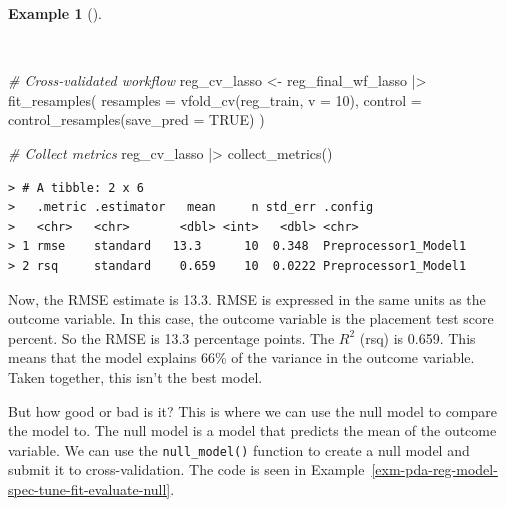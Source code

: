 \documentclass[
  letterpaper,
  DIV=11,
  numbers=noendperiod]{scrreprt}
\newenvironment{Shaded}{\begin{snugshade}}{\end{snugshade}}
\newcommand{\AttributeTok}[1]{\textcolor[rgb]{0.00,0.00,0.00}{#1}}
\newcommand{\CommentTok}[1]{\textcolor[rgb]{0.00,0.00,0.00}{\textit{#1}}}
\newcommand{\ConstantTok}[1]{\textcolor[rgb]{0.00,0.00,0.00}{#1}}
\newcommand{\DecValTok}[1]{\textcolor[rgb]{0.00,0.00,0.00}{#1}}
\newcommand{\FunctionTok}[1]{\textcolor[rgb]{0.00,0.00,0.00}{#1}}
\newcommand{\NormalTok}[1]{\textcolor[rgb]{0.00,0.00,0.00}{#1}}
\newcommand{\OtherTok}[1]{\textcolor[rgb]{0.00,0.00,0.00}{#1}}
\newcommand{\SpecialCharTok}[1]{\textcolor[rgb]{0.00,0.00,0.00}{#1}}
\theoremstyle{definition}
\newtheorem{example}{Example}[chapter]
\theoremstyle{remark}
\begin{document}
\begin{example}[]\protect\hypertarget{exm-pda-reg-model-spec-tune-fit-evaluate}{}\label{exm-pda-reg-model-spec-tune-fit-evaluate}

~

\begin{Shaded}
\begin{Highlighting}[]
\CommentTok{\# Cross{-}validated workflow}
\NormalTok{reg\_cv\_lasso }\OtherTok{\textless{}{-}}
\NormalTok{  reg\_final\_wf\_lasso }\SpecialCharTok{|\textgreater{}}
  \FunctionTok{fit\_resamples}\NormalTok{(}
    \AttributeTok{resamples =} \FunctionTok{vfold\_cv}\NormalTok{(reg\_train, }\AttributeTok{v =} \DecValTok{10}\NormalTok{),}
    \AttributeTok{control =} \FunctionTok{control\_resamples}\NormalTok{(}\AttributeTok{save\_pred =} \ConstantTok{TRUE}\NormalTok{)}
\NormalTok{  )}

\CommentTok{\# Collect metrics}
\NormalTok{reg\_cv\_lasso }\SpecialCharTok{|\textgreater{}}
  \FunctionTok{collect\_metrics}\NormalTok{()}
\end{Highlighting}
\end{Shaded}

\begin{verbatim}
> # A tibble: 2 x 6
>   .metric .estimator   mean     n std_err .config             
>   <chr>   <chr>       <dbl> <int>   <dbl> <chr>               
> 1 rmse    standard   13.3      10  0.348  Preprocessor1_Model1
> 2 rsq     standard    0.659    10  0.0222 Preprocessor1_Model1
\end{verbatim}

\end{example}

Now, the RMSE estimate is 13.3. RMSE is expressed in the same units as
the outcome variable. In this case, the outcome variable is the
placement test score percent. So the RMSE is 13.3 percentage points. The
\(R^2\) (rsq) is 0.659. This means that the model explains 66\% of the
variance in the outcome variable. Taken together, this isn't the best
model.

But how good or bad is it? This is where we can use the null model to
compare the model to. The null model is a model that predicts the mean
of the outcome variable. We can use the \texttt{null\_model()} function
to create a null model and submit it to cross-validation. The code is
seen in Example~\ref{exm-pda-reg-model-spec-tune-fit-evaluate-null}.
\end{document}
